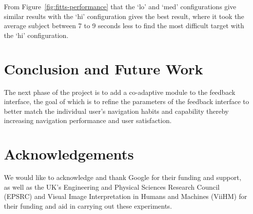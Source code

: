 \documentclass[format=sigconf, review=true, screen=true, anonymous=true]{acmart}
\begin{document}
From Figure~\ref{fig:fitts-performance} that the `lo' and `med' configurations give similar results with the `hi' configuration gives the best result, where it took the average subject between 7 to 9 seconds less to find the most difficult target with the `hi' configuration. 

\section{Conclusion and Future Work}
\label{sec:conclusion}

The next phase of the project is to add a co-adaptive module to the feedback interface, the goal of which is to refine the parameters of the feedback interface to better match the individual user's navigation habits and capability thereby increasing navigation performance and user satisfaction.

\section{Acknowledgements}
\label{sec:ack}

We would like to acknowledge and thank Google for their funding and support, as well as the UK's Engineering and Physical Sciences Research Council (EPSRC) and Visual Image Interpretation in Humans and Machines (ViiHM) for their funding and aid in carrying out these experiments. 



\end{document}
